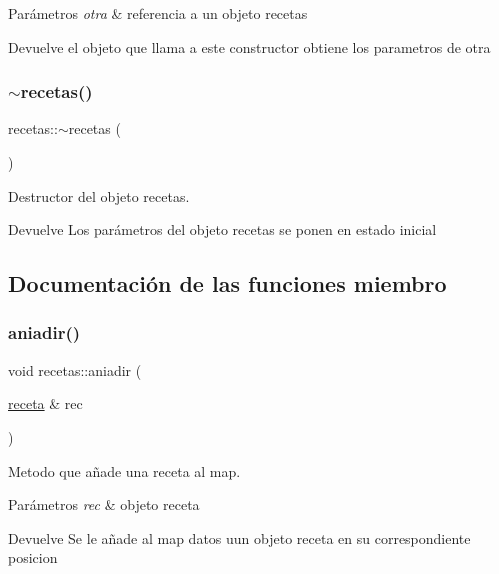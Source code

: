 \begin{DoxyParams}{Parámetros}
{\em otra} & referencia a un objeto recetas \\
\hline
\end{DoxyParams}
\begin{DoxyReturn}{Devuelve}
el objeto que llama a este constructor obtiene los parametros de otra 
\end{DoxyReturn}
\mbox{\label{classrecetas_a2f1ebaeabb8cc344cb7af3667f99645c}} 
\subsubsection{\texorpdfstring{$\sim$recetas()}{~recetas()}}
{\footnotesize\ttfamily recetas\+::$\sim$recetas (\begin{DoxyParamCaption}{ }\end{DoxyParamCaption})}



Destructor del objeto recetas. 

\begin{DoxyReturn}{Devuelve}
Los parámetros del objeto recetas se ponen en estado inicial 
\end{DoxyReturn}


\subsection{Documentación de las funciones miembro}
\mbox{\label{classrecetas_af55a0d5e9394710cf6390fa67f38b49a}} 
\subsubsection{\texorpdfstring{aniadir()}{aniadir()}}
{\footnotesize\ttfamily void recetas\+::aniadir (\begin{DoxyParamCaption}\item[{\hyperlink{classreceta}{receta} \&}]{rec }\end{DoxyParamCaption})}



Metodo que añade una receta al map. 


\begin{DoxyParams}{Parámetros}
{\em rec} & objeto receta \\
\hline
\end{DoxyParams}
\begin{DoxyReturn}{Devuelve}
Se le añade al map datos uun objeto receta en su correspondiente posicion 
\end{DoxyReturn}
\mbox{\label{classrecetas_a7b51f0b8e1d4a5d604cd0d8dd35356a1}} 
